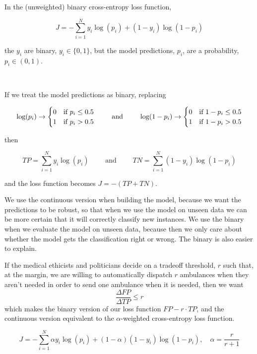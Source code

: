 In the (unweighted) binary cross-entropy loss function, 

$$J = -\sum_{i=1}^N y_i \log( p_i) + (1-y_i) \log( 1 - p_i)$$

the $y_i$ are binary, $y_i \in \{0,1\}$, but the model predictions, $p_i$, are a probability, $p_i \in (0,1)$.  


\

If we treat the model predictions as binary, replacing 

$$
\log ( p_i) \to 
\begin{cases}
	0 & \text{if } p_i \le 0.5 \cr
	1 & \text{if } p_i > 0.5 \cr
\end{cases}
\qquad
\text{ and }
\qquad
\log ( 1 -  p_i) \to 
\begin{cases}
	0 & \text{if } 1 - p_i \le 0.5 \cr
	1 & \text{if } 1 - p_i > 0.5 \cr
\end{cases}
$$

then 

$$ TP = \sum_{i=1}^N y_i \log( p_i)
\qquad
\text{ and }
\qquad
TN = \sum_{i=1}^N  (1-y_i) \log( 1 - p_i)$$

and the loss function becomes $J = -(TP+TN)$.

We use the continuous version when building the model, because we want the predictions to be robust, so that when we use the model on unseen data we can be more certain that it will correctly classify new instances.  We use the binary when we evaluate the model on unseen data, because then we only care about whether the model gets the classification right or wrong.  The binary is also easier to explain.


If the medical ethicists and politicians decide on a tradeoff threshold, $r$ such that, at the margin, we are willing to automatically dispatch $r$ ambulances when they aren't needed in order to send one ambulance when it is needed, then we want $$\frac{\Delta FP}{\Delta TP} \le r$$
which makes the binary version of our loss function $FP - r\cdot TP$, and the continuous version equivalent to the $\alpha$-weighted cross-entropy loss function.

$$J = -\sum_{i=1}^N \alpha y_i \log( p_i) + (1-\alpha)(1-y_i) \log( 1 - p_i), \quad \alpha = \frac{r}{r+1}$$

